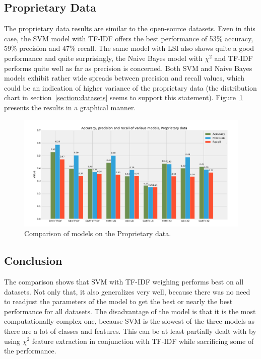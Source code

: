 \subsection{Proprietary Data}

The proprietary data results are similar to the open-source datasets. Even in this case, the SVM model with TF-IDF offers the best performance of 53\% accuracy, 59\% precision and 47\% recall. The same model with LSI also shows quite a good performance and quite surprisingly, the Naive Bayes model with $\chi^2$ and TF-IDF performs quite well as far as precision is concerned. Both SVM and Naive Bayes models exhibit rather wide spreads between precision and recall values, which could be an indication of higher variance of the proprietary data (the distribution chart in section~\ref{section:datasets} seems to support this statement). Figure~\ref{fig:results.models.proprietary} presents the results in a graphical manner.

\begin{figure}[htbp]
    \centering
        \includegraphics[width=\textwidth]{./images/comparison_of_models/proprietary.pdf}
    \caption{Comparison of models on the Proprietary data.}
    \label{fig:results.models.proprietary}
\end{figure}

\subsection{Conclusion}

The comparison shows that SVM with TF-IDF weighing performs best on all datasets. Not only that, it also generalizes very well, because there was no need to readjust the parameters of the model to get the best or nearly the best performance for all datasets. The disadvantage of the model is that it is the most computationally complex one, because SVM is the slowest of the three models as there are a lot of classes and  features. This can be at least partially dealt with by using $\chi^2$ feature extraction in conjunction with TF-IDF while sacrificing some of the performance.

